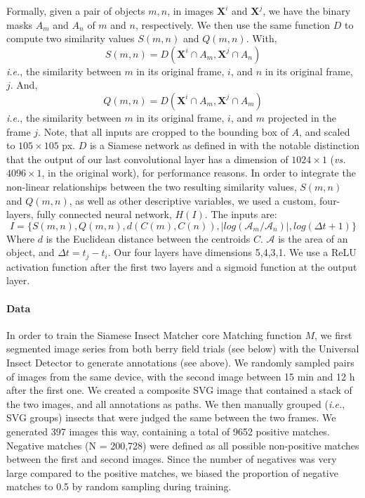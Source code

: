 \documentclass[12pt]{article}
\begin{document}
\begin{linenumbers}
		
		Formally, given a pair of objects $m, n$, in images $\mathbf{X}^i$ and $\mathbf{X}^j$, we have the binary masks $A_m$ and $A_n$ of $m$ and $n$, respectively.
		We then use the same function $D$ to compute two similarity values $S(m,n)$ and $Q(m,n)$. 
		With,
		$$
		S(m,n) = D(\mathbf{X}^i \cap A_m , \mathbf{X}^j \cap A_n )
		$$
		\emph{i.e.}, the similarity between $m$ in its original frame, $i$, and $n$ in its original frame, $j$. And,
		$$
		Q(m,n) = D(\mathbf{X}^i \cap  A_m , \mathbf{X}^j \cap A_m )
		$$
		\emph{i.e.}, the similarity between $m$ in its original frame, $i$, and $m$ projected in the frame $j$. Note, that all inputs are cropped to the bounding box of $A$, and scaled to $105 \times{} 105$ px. $D$ is a Siamese network as defined in\cite{koch_siamese_2015} with the notable distinction that the output of our last convolutional layer has a dimension of $1024 \times{} 1$ (\emph{vs.} $4096 \times{} 1$, in the original work), for performance reasons. 
		In order to integrate the non-linear relationships between the two resulting similarity values, $S(m,n)$ and $Q(m,n)$, as well as other descriptive variables, we used a custom, four-layers, fully connected neural network, $H(I)$. The inputs are: 
		$$
		I=\{ S(m,n), Q(m,n), d(C(m), C(n)), |log(\mathcal{A}_m/\mathcal{A}_n)|, log(\Delta t + 1)\}
		$$ Where $d$ is the Euclidean distance between the centroids $C$. $\mathcal{A}$ is the area of an object, and $\Delta t = t_j- t_i$. Our four layers have dimensions {5,4,3,1}. We use a ReLU activation function after the first two layers and a sigmoid function at the output layer.

		\paragraph{Data}
		In order to train the Siamese Insect Matcher core Matching function $M$, we first segmented image series from both berry field trials (see below) with the Universal Insect Detector to generate annotations (see above). We randomly sampled pairs of images from the same device, with the second image between 15 min and 12 h after the first one. We created a composite SVG image that contained a stack of the two images, and all annotations as paths. We then manually grouped (\emph{i.e.}, SVG groups) insects that were judged the same between the two frames. We generated 397 images this way, containing a total of 9652 
		positive matches. Negative matches (N = 200,728) were defined as all possible non-positive matches between the first and second images. Since the number of negatives was very large compared to the positive matches, we biased the proportion of negative matches to 0.5 by random sampling during training.


\end{linenumbers}
\end{document}
